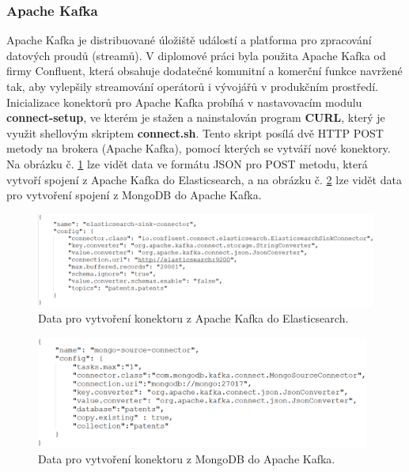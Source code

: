 \subsubsection{Apache Kafka}
Apache Kafka je distribuované úložiště událostí a platforma pro zpracování datových proudů (streamů). V diplomové práci byla použita Apache Kafka od firmy Confluent, která obsahuje dodatečné komunitní a komerční funkce navržené tak, aby vylepšily streamování operátorů i vývojářů v produkčním prostředí.
\newline
\indent Inicializace konektorů pro Apache Kafka probíhá v nastavovacím modulu \textbf{connect-setup}, ve kterém je stažen a nainstalován program \textbf{CURL}, který je využit shellovým skriptem \textbf{connect.sh}. Tento skript posílá dvě \gls{HTTP} POST metody na brokera (Apache Kafka), pomocí kterých se vytváří nové konektory. Na obrázku č. \ref{fig:sink} lze vidět data ve formátu JSON pro POST metodu, která vytvoří spojení z Apache Kafka do Elasticsearch, a na obrázku č. \ref{fig:source} lze vidět data pro vytvoření spojení z MongoDB do Apache Kafka.
\begin{figure}[H]
\centering
\includegraphics[width=12cm]{img/sink}
\caption{Data pro vytvoření konektoru z Apache Kafka do Elasticsearch.}
\label{fig:sink}
\end{figure}
\begin{figure}[H]
\centering
\includegraphics[width=11cm]{img/source}
\caption{Data pro vytvoření konektoru z MongoDB do Apache Kafka.}
\label{fig:source}
\end{figure}


